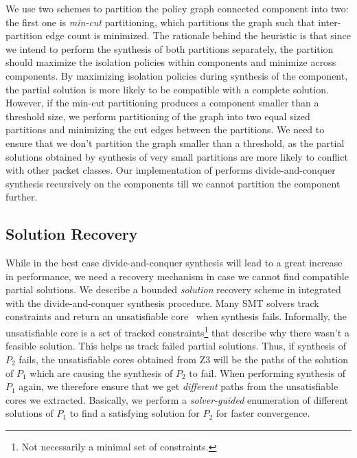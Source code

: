 We use two schemes to partition the policy graph connected component into two: the
first one is \emph{min-cut} partitioning, which partitions the graph
such that inter-partition edge count is minimized. The
rationale behind the heuristic is that since we intend to perform the
synthesis of both partitions separately, the partition should maximize
the isolation policies within components and minimize across
components. By maximizing isolation policies during synthesis of the
component, the partial solution is more likely to be compatible with a
complete solution. However, if the min-cut partitioning produces a
component smaller than a threshold size, we perform partitioning of
the graph into two equal sized partitions and minimizing the cut edges
between the partitions. We need to ensure that we don't partition the
graph smaller than a threshold, as the partial solutions obtained by
synthesis of very small partitions are more likely to conflict with
other packet classes. Our implementation of \Name performs
divide-and-conquer synthesis recursively on the components till we cannot partition the
component further. 

\subsection{Solution Recovery} \label{sec:recovery}
While in the best case divide-and-conquer synthesis  will lead to a great
increase in performance, we need a recovery mechanism in case we cannot find
compatible partial solutions.  We describe a bounded \emph{solution} recovery
scheme in  integrated with the divide-and-conquer
synthesis procedure.  Many SMT solvers track constraints and return
an unsatisfiable core~\cite{unsatcores} when synthesis fails. Informally,
the unsatisfiable
core is a set of tracked constraints\footnote{
	Not necessarily a minimal set of constraints.}
 that describe why there wasn't a feasible 
solution. This helps us track failed partial solutions. 
Thus, if synthesis of $P_2$ fails, the unsatisfiable cores
obtained from Z3 will be the paths of the solution of $P_1$ which are
causing the synthesis of $P_2$ to fail. 
When performing synthesis of $P_1$
again, we therefore ensure that we get \emph{different} paths from the
unsatisfiable cores we extracted.  Basically, we perform a 
\emph{solver-guided} enumeration of different solutions of $P_1$ to
find a satisfying solution for $P_2$ for faster convergence.

